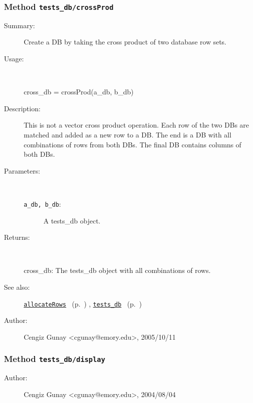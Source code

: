 \subsubsection[Method \texttt{crossProd}]{Method \texttt{tests\_db/crossProd}}%
%
\label{ref_tests_db__crossProd}%
\hypertarget{ref_tests_db__crossProd}{}%
\begin{description}
\item[Summary:]Create a DB by taking the cross product of two database row sets.
%
\item[Usage:]~%
\begin{lyxcode}%
cross\_db = crossProd(a\_db, b\_db)
%
\end{lyxcode}%
%
\item[Description:]%
This is not a vector cross product operation. Each row of the two DBs are matched 
 and added as a new row to a DB. The end is a DB with all combinations 
 of rows from both DBs. The final DB contains columns of both DBs.
\item[Parameters:]~
\begin{description}%
\item[\texttt{a\_db, b\_db}:]
 A tests\_db object.
\end{description}%
%
\item[Returns:]~

	cross\_db: The tests\_db object with all combinations of rows.
%
%
\item[See also:]%
\hyperlink{ref_allocateRows}{\texttt{allocateRows}}%
\ (p.~\pageref{ref_allocateRows})%
%
, \hyperlink{ref_tests_db}{\texttt{tests\_db}}%
\ (p.~\pageref{ref_tests_db})%
%
%
\item[Author:]%
Cengiz Gunay <cgunay@emory.edu>, 2005/10/11%
\end{description}
\methodline%
\subsubsection[Method \texttt{display}]{Method \texttt{tests\_db/display}}%
%
\label{ref_tests_db__display}%
\hypertarget{ref_tests_db__display}{}%
\begin{description}
%
%
%
%
%
%
%
\item[Author:]%
Cengiz Gunay <cgunay@emory.edu>, 2004/08/04%
\end{description}
\methodline%
